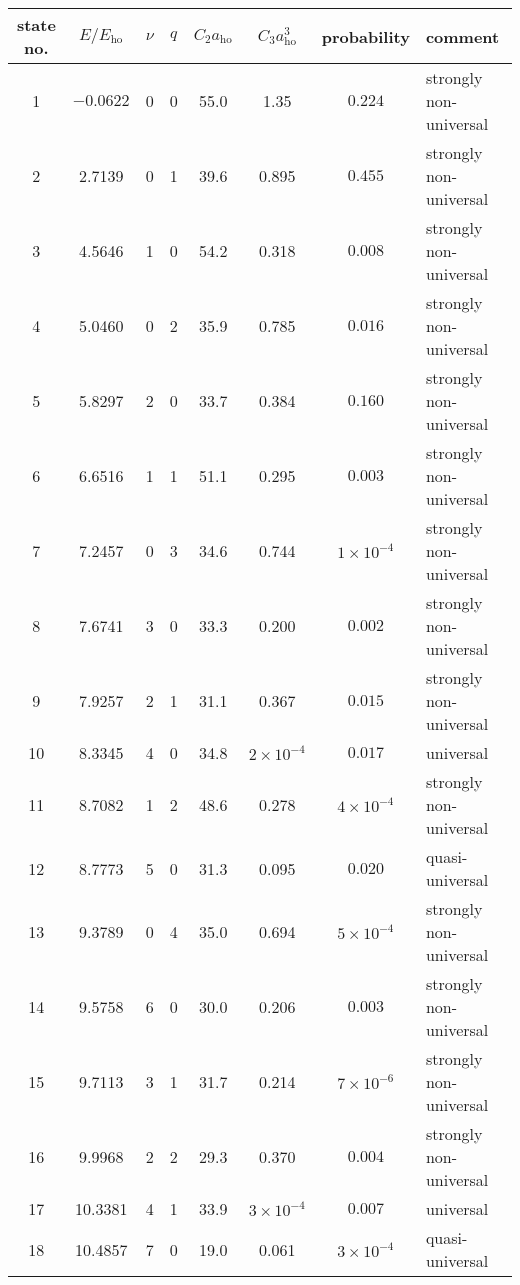 \documentclass[aps,pra,twocolumn,showpacs,superscriptaddress]{revtex4}
\begin{document}
\begin{widetext}

\begin{table}
  \begin{center}
  \begin{tabular}{c|c|c|c|c|c| c|l}
  state no.  & $E / E_{\text{ho}}$ & $\nu$ & $q$ & $C_2 a_{\text{ho}}$ & $C_3 a_{\text{ho}}^3$ & probability & comment \\
    \hline
    1  & $-0.0622$ & 0 & 0 & 55.0 & 1.35& $0.224$ & strongly non-universal \\
    2  & 2.7139 & 0 & 1 & 39.6 & 0.895 & $0.455$ & strongly non-universal \\
    3  & 4.5646 & 1 & 0 & 54.2 & 0.318 & $0.008$ & strongly non-universal \\
    4  & 5.0460 & 0 & 2 & 35.9 & 0.785 & $0.016$ & strongly non-universal \\
    5  & 5.8297 & 2 & 0 & 33.7 & 0.384 & $0.160$ & strongly non-universal \\
    6  & 6.6516 & 1 & 1 & 51.1 & 0.295 & $0.003$ & strongly non-universal \\
    7  & 7.2457 & 0 & 3 & 34.6 & 0.744 & $1 \times 10^{-4}$ & strongly non-universal \\
    8  & 7.6741 & 3 & 0 & 33.3 & 0.200 & $0.002$ & strongly non-universal \\
    9  & 7.9257 & 2 & 1 & 31.1 & 0.367 & $0.015$ & strongly non-universal \\
    10  & 8.3345 & 4 & 0 & 34.8 & $2 \times 10^{-4}$ & $0.017$ &  universal \\
    11  & 8.7082 & 1 & 2 & 48.6 & 0.278 & $4 \times 10^{-4}$ & strongly non-universal \\
    12  & 8.7773 & 5 & 0 & 31.3 & 0.095 & $0.020$ &  quasi-universal\\
    13  & 9.3789 & 0 & 4 & 35.0 & 0.694 & $5 \times 10^{-4}$ & strongly non-universal \\
    14  & 9.5758 & 6 & 0 & 30.0 & 0.206 & $0.003$ & strongly non-universal \\
    15  & 9.7113 & 3 & 1 & 31.7 & 0.214 & $7 \times 10^{-6}$ & strongly non-universal \\
    16  & 9.9968 & 2 & 2 & 29.3 & 0.370 & $0.004$ & strongly non-universal \\
    17  & 10.3381 & 4 & 1& 33.9 & $3 \times 10^{-4}$ & $0.007$ &  universal \\
    18  & 10.4857 & 7 & 0 & 19.0 & 0.061 & $3 \times 10^{-4}$ &  quasi-universal \\

\end{tabular}
\end{center}
\end{table}
\end{widetext}
\end{document}
